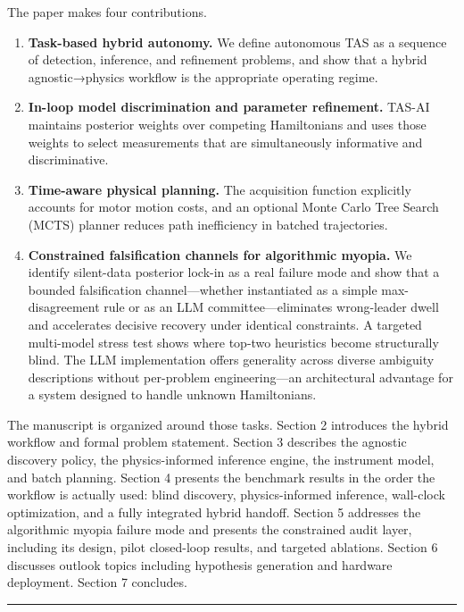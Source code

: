 \documentclass[
]{article}
\providecommand{\tightlist}{%
  \setlength{\itemsep}{0pt}\setlength{\parskip}{0pt}}
\begin{document}
The paper makes four contributions.

\begin{enumerate}
\def\labelenumi{\arabic{enumi}.}
\tightlist
\item
  \textbf{Task-based hybrid autonomy.} We define autonomous TAS as a
  sequence of detection, inference, and refinement problems, and show
  that a hybrid agnostic→physics workflow is the appropriate operating
  regime.
\item
  \textbf{In-loop model discrimination and parameter refinement.} TAS-AI
  maintains posterior weights over competing Hamiltonians and uses those
  weights to select measurements that are simultaneously informative and
  discriminative.
\item
  \textbf{Time-aware physical planning.} The acquisition function
  explicitly accounts for motor motion costs, and an optional Monte
  Carlo Tree Search (MCTS) planner reduces path inefficiency in batched
  trajectories.
\item
  \textbf{Constrained falsification channels for algorithmic myopia.} We
  identify silent-data posterior lock-in as a real failure mode and show
  that a bounded falsification channel---whether instantiated as a
  simple max-disagreement rule or as an LLM committee---eliminates
  wrong-leader dwell and accelerates decisive recovery under identical
  constraints. A targeted multi-model stress test shows where top-two
  heuristics become structurally blind. The LLM implementation offers
  generality across diverse ambiguity descriptions without per-problem
  engineering---an architectural advantage for a system designed to
  handle unknown Hamiltonians.
\end{enumerate}

The manuscript is organized around those tasks. Section 2 introduces the
hybrid workflow and formal problem statement. Section 3 describes the
agnostic discovery policy, the physics-informed inference engine, the
instrument model, and batch planning. Section 4 presents the benchmark
results in the order the workflow is actually used: blind discovery,
physics-informed inference, wall-clock optimization, and a fully
integrated hybrid handoff. Section 5 addresses the algorithmic myopia
failure mode and presents the constrained audit layer, including its
design, pilot closed-loop results, and targeted ablations. Section 6
discusses outlook topics including hypothesis generation and hardware
deployment. Section 7 concludes.

\begin{center}\rule{0.5\linewidth}{0.5pt}\end{center}
\end{document}
